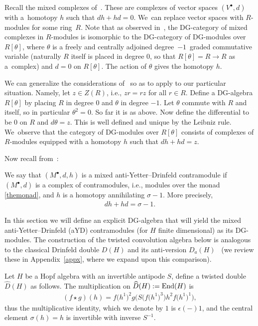 Recall the mixed complexes of~\cite{kassel}. These are complexes of vector spaces $(V^\bullet,d)$ with a~homo\-topy $h$ such that $dh+hd=0$. We~can replace vector spaces with $R$-modules for some ring~$R$. Note that as observed in~\cite{kassel}, the DG-category of mixed complexes in $R$-modules is isomorphic to the DG-category of DG-modules over $R[\theta]$, where $\theta$ is a freely and centrally adjoined degree~$-1$~graded commutative variable (naturally $R$ itself is placed in degree $0$, so that $R[\theta]=R\to R$ as a~comp\-lex) and $d=0$ on $R[\theta]$. The action of $\theta$ gives the homotopy $h$.

We can generalize the considerations of~\cite{kassel} so as to apply to our particular situation. Namely, let $z\in Z(R)$, i.e., $zr=rz$ for all $r\in R$. Define a DG-algebra $R[\theta]$ by placing $R$ in degree $0$ and $\theta$ in degree $-1$. Let $\theta$ commute with $R$ and itself, so in particular $\theta^2=0$. So far it is as above. Now define the differential to be $0$ on $R$ and $d\theta=z$. This is well defined and unique by the Leibniz rule. We~observe that the category of DG-modules over $R[\theta]$ consists of complexes of $R$-modules equipped with a homotopy $h$ such that $dh+hd=z$.

Now recall from~\cite{chern}:

\begin{Definition}
We say that $(M^\bullet,d,h)$ is a mixed anti-Yetter--Drinfeld contramodule if $(M^\bullet,d)$ is a complex of contramodules, i.e., modules over the monad \eqref{themonad}, and $h$ is a homotopy annihilating $\sigma-1$. More precisely,
\begin{gather}
dh+hd=\sigma-1.
\end{gather}
\end{Definition}

In this section we will define an explicit DG-algebra that will yield the mixed anti-Yetter--Drinfeld (aYD) contramodules (for $H$ finite dimensional) as its DG-modules. The construction of the twisted convolution algebra below is analogous to the classical Drinfeld double $D(H)$ and its anti-version $D_a(H)$~\cite{HKRS2} (we review these in Appendix~\ref{appx}, where we expand upon this comparison).

\begin{Definition}\label{dhhat}
Let $H$ be a Hopf algebra with an invertible antipode $S$, define a twisted double~$\widehat{D}(H)$ as follows. The multiplication on $\widehat{D}(H):={\rm End}(H)$ is
\begin{gather}\label{mult}
(f\star g)(h)= f\big(h^1\big)^2g\big(S\big(f\big(h^1\big)^3\big)h^2f\big(h^1\big)^1\big),
\end{gather}
thus the multiplicative identity, which we denote by $1$ is $\epsilon(-)1$, and the central element $\sigma(h)=h$ is invertible with inverse $S^{-1}$.
\end{Definition}

